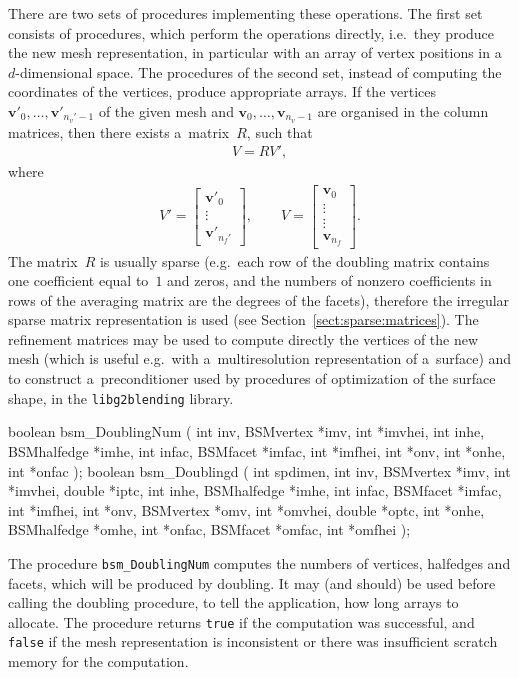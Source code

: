 There are two sets of procedures implementing these operations. The first
set consists of procedures, which perform the operations directly, i.e.\
they produce the new mesh representation, in particular with an array of
vertex positions in a~$d$-dimensional space. The procedures of the second
set, instead of computing the coordinates of the vertices, produce
appropriate arrays. If the vertices $\bm{v}'_0,\ldots,\bm{v}'_{n_v'-1}$ of
the given mesh and $\bm{v}_0,\ldots,\bm{v}_{n_v-1}$ are organised in the
column matrices, then there exists a~matrix~$R$, such that
\begin{align*}
  V = RV',
\end{align*}
where
\begin{align*}
  V' = \left[\begin{array}{c}\bm{v}'_0 \\ \vdots \\ \bm{v}'_{n_f'}
  \end{array}\right],\qquad
  V = \left[\begin{array}{c}\bm{v}_0 \\ \vdots \\[-7pt] \vdots \\ \bm{v}_{n_f}
  \end{array}\right].
\end{align*}
The matrix~$R$ is usually sparse (e.g.\ each row of the doubling matrix
contains one coefficient equal to~$1$ and zeros, and the numbers of nonzero
coefficients in rows of the averaging matrix are the degrees of the facets),
therefore the irregular sparse matrix representation is used (see
Section~\ref{sect:sparse:matrices}). The refinement
matrices may be used to compute directly the vertices of the new mesh (which
is useful e.g.\ with a~multiresolution representation of a~surface) and to
construct a~preconditioner used by procedures of optimization of the surface
shape, in the \texttt{libg2blending} library.

\medskip
\begin{listingC}
boolean bsm_DoublingNum ( int inv, BSMvertex *imv, int *imvhei,
                          int inhe, BSMhalfedge *imhe,
                          int infac, BSMfacet *imfac, int *imfhei,
                          int *onv, int *onhe, int *onfac );
boolean bsm_Doublingd ( int spdimen,
                int inv, BSMvertex *imv, int *imvhei, double *iptc,
                int inhe, BSMhalfedge *imhe,
                int infac, BSMfacet *imfac, int *imfhei,
                int *onv, BSMvertex *omv, int *omvhei, double *optc,
                int *onhe, BSMhalfedge *omhe,
                int *onfac, BSMfacet *omfac, int *omfhei );
\end{listingC}
The procedure \texttt{bsm\_DoublingNum} computes the numbers of vertices,
halfedges and facets, which will be produced by doubling. It may (and
should) be used before calling the doubling procedure, to tell the
application, how long arrays to allocate. The procedure returns \texttt{true}
if the computation was successful, and \texttt{false} if the mesh
representation is inconsistent or there was insufficient scratch memory for
the computation.

